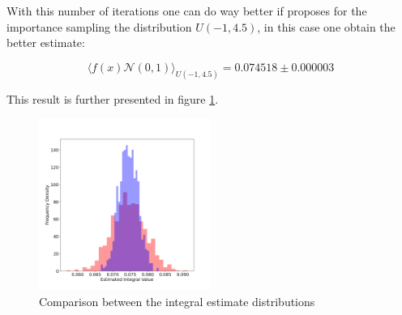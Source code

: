 With this number of iterations one can do way better if proposes for the importance sampling the distribution $U(-1, 4.5)$, in this case one obtain the better estimate:

$$ \langle f(x)\mathcal{N}(0,1) \rangle_{U(-1,4.5)} =  0.074518 \pm 0.000003  $$

This result is further presented in figure \ref{lec3:comparison_part2}.

\begin{figure}[H]
  \centering
  \includegraphics[width=0.5\textwidth]{FIG/exercise_3_images/distribution_comparison_part2.png}
  \caption{Comparison between the integral estimate distributions}
  \label{lec3:comparison_part2}
  \end{figure}

